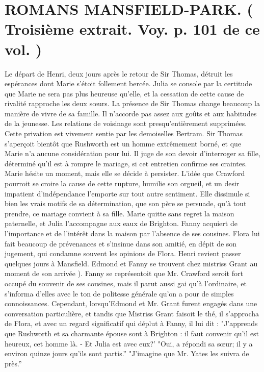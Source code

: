 \setcounter{page}{243}
\section{ROMANS \large{MANSFIELD-PARK.} \small{( Troisième extrait. Voy. p. 101 de ce vol. )}}
Le départ de Henri, deux jours après le retour de Sir Thomas, détruit les espérances dont Marie s'étoit follement bercée. Julia se console par la certitude que Marie ne sera pas plus heureuse qu'elle, et la cessation de cette cause de rivalité rapproche les deux sœurs. La présence de Sir Thomas change beaucoup la manière de vivre de sa famille. Il n'accorde pas assez aux goûts et aux habitudes de la jeunesse. Les relations de voisinage sont presqu'entièrement supprimées. Cette privation est vivement sentie par les demoiselles Bertram. Sir Thomas s'aperçoit bientôt que Rushworth est un homme extrêmement borné, et que Marie n'a aucune considération pour lui. Il juge de son devoir d'interroger sa fille, déterminé qu'il est à rompre le mariage, si cet entretien confirme ses craintes. Marie hésite un moment, mais elle se décide à persister.\setcounter{page}{244} L'idée que Crawford pourroit se croire la cause de cette rupture, humilie son orgueil, et un desir impatient d'indépendance l'emporte sur tout autre sentiment. Elle dissimule si bien les vrais motifs de sa détermination, que son père se persuade, qu'à tout prendre, ce mariage convient à sa fille.
Marie quitte sans regret la maison paternelle, et Julia l'accompagne aux eaux de Brighton.
Fanny acquiert de l'importance et de l'intérêt dans la maison par l'absence de ses cousines. Flora lui fait beaucoup de prévenances et s'insinue dans son amitié, en dépit de son jugement, qui condamne souvent les opinions de Flora. Henri revient passer quelques jours à Mansfield. Edmond et Fanny se trouvent chez mistriss Grant au moment de son arrivée ).
Fanny se représentoit que Mr. Crawford seroit fort occupé du souvenir de ses cousines, mais il parut aussi gai qu'à l'ordinaire, et s'informa d'elles avec le ton de politesse générale qu'on a pour de simples connoissances. Cependant, lorsqu'Edmond et Mr. Grant furent engagés dans une conversation particulière, et tandis que Mistriss Grant faisoit le thé, il s'approcha de Flora, et avec un regard significatif qui déplut à Fanny,\setcounter{page}{245} il lui dit : "J'apprends que Rushworth et sa charmante épouse sont à Brighton : il faut convenir qu'il est heureux, cet homme là. - Et Julia est avec eux?'
"Oui, a répondi sa sœur; il y a environ quinze jours qu'ils sont partis.''
"J'imagine que Mr. Yates les suivra de près.''
